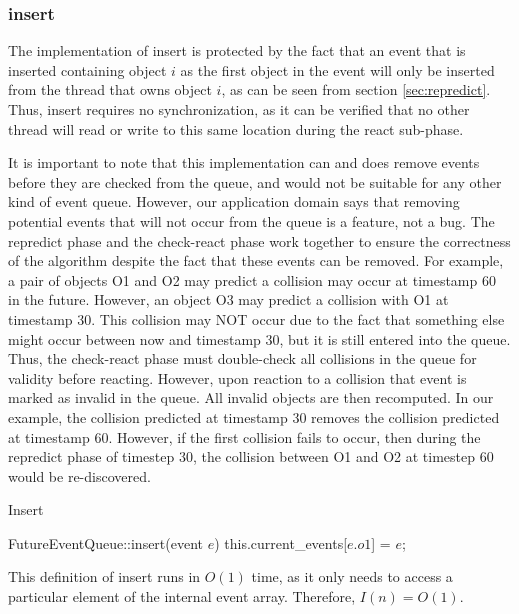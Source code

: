 \documentclass[CEJCS,PDF]{cej} %
\begin{document}
\subsubsection{insert}

The implementation of insert is protected by the fact that an event that is inserted containing object $i$ as the first object in the event will only
be inserted from the thread that owns object $i$, as can be seen from section \ref{sec:repredict}.  Thus, insert requires no synchronization, as it can be verified
that no other thread will read or write to this same location during the react sub-phase.  

It is important to note that this implementation can and does remove events before they are checked from the queue,
and would not be suitable for any other kind of event queue.  However, our application domain says that removing potential events that will not occur from the queue is a feature, not a bug.
The repredict phase and the check-react phase work together to ensure the correctness of the algorithm despite the fact that these events can be removed.
For example, a pair of objects O1 and O2 may predict a collision may occur at timestamp 60 in the future.  However, an object O3 may predict a collision with O1 at timestamp 30.
This collision may NOT occur due to the fact that something else might occur between now and timestamp 30, but it is still entered into the queue.  Thus, the check-react phase must double-check
all collisions in the queue for validity before reacting.  However, upon reaction to a collision that event is marked as invalid in the queue.  All invalid
objects are then recomputed.  In our example, the collision predicted at timestamp 30 removes the collision predicted at timestamp 60.  However,
if the first collision fails to occur, then during the repredict phase of timestep 30, the collision between O1 and O2 at timestep 60 would be re-discovered.

\begin{algorithm}
\caption{Insert}
\begin{algorithmic}
\STATE FutureEventQueue::insert(event $e$)
	\STATE this.current\_events[$e.o1$] = $e$;
\ENDIF
\end{algorithmic}
\end{algorithm}

This definition of insert runs in $O(1)$ time, as it only needs to access a particular element of the internal event array.  Therefore, $I(n)=O(1)$.
\end{document}
